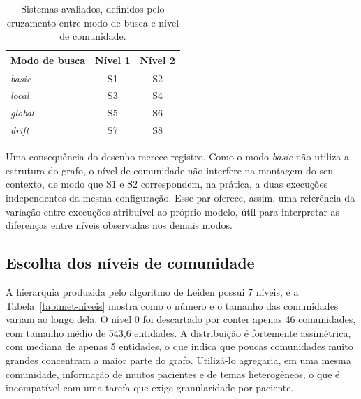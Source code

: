 \begin{table}[!htbp]
\centering
\caption{Sistemas avaliados, definidos pelo cruzamento entre modo de busca e nível de comunidade.}
\label{tab:met-sistemas}
\begin{tabular}{lcc}
\toprule
Modo de busca & Nível 1 & Nível 2 \\
\midrule
\textit{basic}  & S1 & S2 \\
\textit{local}  & S3 & S4 \\
\textit{global} & S5 & S6 \\
\textit{drift}  & S7 & S8 \\
\bottomrule
\end{tabular}
\par{}
\end{table}

Uma consequência do desenho merece registro. Como o modo \textit{basic} não utiliza a estrutura do grafo, o nível de comunidade não interfere na montagem do seu contexto, de modo que S1 e S2 correspondem, na prática, a duas execuções independentes da mesma configuração. Esse par oferece, assim, uma referência da variação entre execuções atribuível ao próprio modelo, útil para interpretar as diferenças entre níveis observadas nos demais modos.

\subsection{Escolha dos níveis de comunidade}\label{sec:met-niveis}

A hierarquia produzida pelo algoritmo de Leiden possui 7 níveis, e a Tabela~\ref{tab:met-niveis} mostra como o número e o tamanho das comunidades variam ao longo dela. O nível 0 foi descartado por conter apenas 46 comunidades, com tamanho médio de 543,6 entidades. A distribuição é fortemente assimétrica, com mediana de apenas 5 entidades, o que indica que poucas comunidades muito grandes concentram a maior parte do grafo. Utilizá-lo agregaria, em uma mesma comunidade, informação de muitos pacientes e de temas heterogêneos, o que é incompatível com uma tarefa que exige granularidade por paciente.

